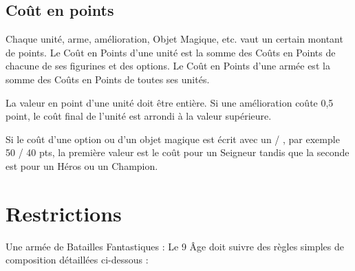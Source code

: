 \subsection{Coût en points}

Chaque unité, arme, amélioration, Objet Magique, etc. vaut un certain montant de points. Le Coût en Points d'une unité est la somme des Coûts en Points de chacune de ses figurines et des options. Le Coût en Points d'une armée est la somme des Coûts en Points de toutes ses unités.

\noindent\textbf{}

La valeur en point d'une unité doit être entière. Si une amélioration coûte 0,5 point, le coût final de l'unité est arrondi à la valeur supérieure.

\noindent\textbf{}

Si le coût d'une option ou d'un objet magique est écrit avec un \og / \fg{}, par exemple 50 / 40 pts, la première valeur est le coût pour un Seigneur tandis que la seconde est pour un Héros ou un Champion.

\section{Restrictions}

Une armée de Batailles Fantastiques : Le 9\ieme{} Âge doit suivre des règles simples de composition détaillées ci-dessous :

